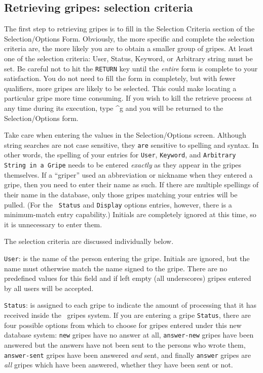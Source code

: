 \subsection{Retrieving gripes: selection criteria}

The first step to retrieving gripes is to fill in the Selection
Criteria section of the Selection/Options Form. Obviously, the more
specific and complete the selection criteria are, the more likely you
are to obtain a smaller group of gripes.  At least one of the
selection criteria: User, Status, Keyword, or Arbitrary string must be
set.  Be careful not to hit the {\tt RETURN} key until the {\it
entire} form is complete to your satisfaction. You do not need to fill
the form in completely, but with fewer qualifiers, more gripes are
likely to be selected. This could make locating a particular gripe
more time consuming. If you wish to kill the retrieve process at any
time during its execution, type \^{ }g and you will be returned to the
Selection/Options form.

Take care when entering the values in the Selection/Options screen.
Although string searches are not case sensitive, they {\tt are}
sensitive to spelling and syntax.  In other words, the spelling of
your entries for {\tt User}, {\tt Keyword}, and {\tt Arbitrary String
in a Gripe} needs to be entered {\it exactly} as they appear in the
gripes themselves.  If a ``griper'' used an abbreviation or nickname
when they entered a gripe, then you need to enter their name as such.
If there are multiple spellings of their name in the database, only
those gripes matching your entries will be pulled. (For the {\tt
Status} and {\tt Display} options entries, however, there is a
minimum-match entry capability.)  Initials are completely ignored at
this time, so it is unnecessary to enter them.

The selection criteria are discussed individually below.

{\tt User}: is the name of the person entering the gripe.  Initials
are ignored, but the name must otherwise match the name signed to the
gripe.  There are no predefined values for this field and if left
empty (all underscores) gripes entered by all users will be accepted.

{\tt Status}: is assigned to each gripe to indicate the amount of
processing that it has received inside the \AIPS\ gripes system. If
you are entering a gripe {\tt Status}, there are four possible options
from which to choose for gripes entered under this new database
system: {\tt new} gripes have no answer at all, {\tt answer-new}
gripes have been answered but the answers have not been sent to the
persons who wrote them, {\tt answer-sent} gripes have been answered
{\it and} sent, and finally {\tt answer} gripes are {\it all} gripes
which have been answered, whether they have been sent or not.


